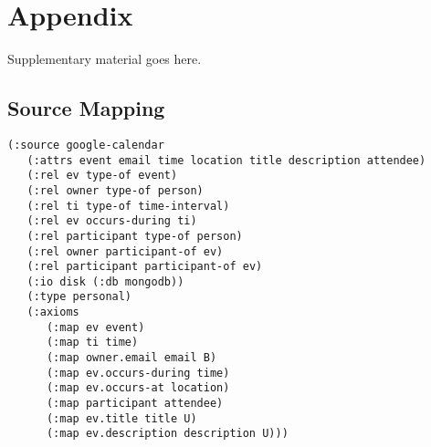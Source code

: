 
\appendix
\chapter{Appendix}

Supplementary material goes here.

\section{Source Mapping}

\begin{verbatim}
(:source google-calendar
   (:attrs event email time location title description attendee)
   (:rel ev type-of event)
   (:rel owner type-of person)
   (:rel ti type-of time-interval)
   (:rel ev occurs-during ti)
   (:rel participant type-of person)
   (:rel owner participant-of ev)
   (:rel participant participant-of ev)
   (:io disk (:db mongodb))
   (:type personal)
   (:axioms
      (:map ev event)
      (:map ti time)
      (:map owner.email email B)
      (:map ev.occurs-during time)
      (:map ev.occurs-at location)
      (:map participant attendee)
      (:map ev.title title U)
      (:map ev.description description U)))
\end{verbatim}

